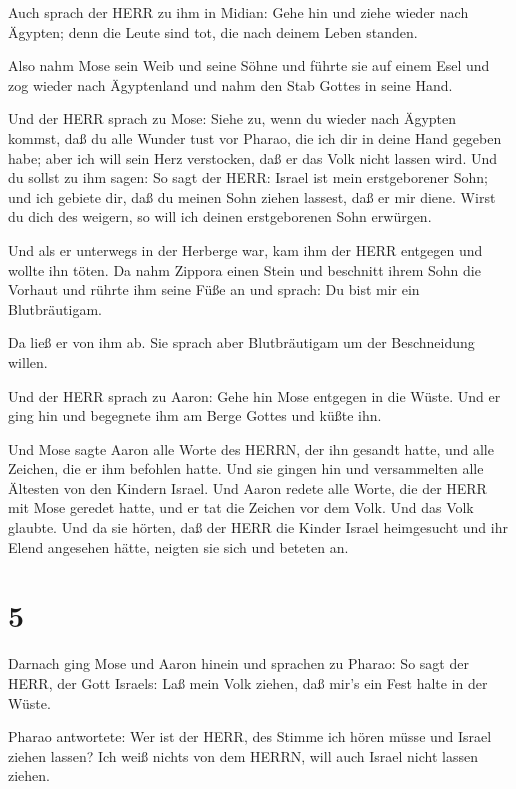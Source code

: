  Auch sprach der HERR zu ihm in Midian: Gehe hin und ziehe
wieder nach Ägypten; denn die Leute sind tot, die nach deinem Leben
standen.

 Also nahm Mose sein Weib und seine Söhne und führte sie
auf einem Esel und zog wieder nach Ägyptenland und nahm den Stab Gottes
in seine Hand.

 Und der HERR sprach zu Mose: Siehe zu, wenn du wieder nach
Ägypten kommst, daß du alle Wunder tust vor Pharao, die ich dir in deine
Hand gegeben habe; aber ich will sein Herz verstocken, daß er das Volk
nicht lassen wird.  Und du sollst zu ihm sagen: So sagt der
HERR: Israel ist mein erstgeborener Sohn;  und ich gebiete
dir, daß du meinen Sohn ziehen lassest, daß er mir diene. Wirst du dich
des weigern, so will ich deinen erstgeborenen Sohn erwürgen.

 Und als er unterwegs in der Herberge war, kam ihm der HERR
entgegen und wollte ihn töten.  Da nahm Zippora einen Stein
und beschnitt ihrem Sohn die Vorhaut und rührte ihm seine Füße an und
sprach: Du bist mir ein Blutbräutigam.

 Da ließ er von ihm ab. Sie sprach aber Blutbräutigam um
der Beschneidung willen.

 Und der HERR sprach zu Aaron: Gehe hin Mose entgegen in
die Wüste. Und er ging hin und begegnete ihm am Berge Gottes und küßte
ihn.

 Und Mose sagte Aaron alle Worte des HERRN, der ihn gesandt
hatte, und alle Zeichen, die er ihm befohlen hatte.  Und
sie gingen hin und versammelten alle Ältesten von den Kindern Israel.
 Und Aaron redete alle Worte, die der HERR mit Mose geredet
hatte, und er tat die Zeichen vor dem Volk.  Und das Volk
glaubte. Und da sie hörten, daß der HERR die Kinder Israel heimgesucht
und ihr Elend angesehen hätte, neigten sie sich und beteten an.

\hypertarget{section-4}{%
\section{5}\label{section-4}}

 Darnach ging Mose und Aaron hinein und sprachen zu Pharao:
So sagt der HERR, der Gott Israels: Laß mein Volk ziehen, daß mir's ein
Fest halte in der Wüste.

 Pharao antwortete: Wer ist der HERR, des Stimme ich hören
müsse und Israel ziehen lassen? Ich weiß nichts von dem HERRN, will auch
Israel nicht lassen ziehen.

